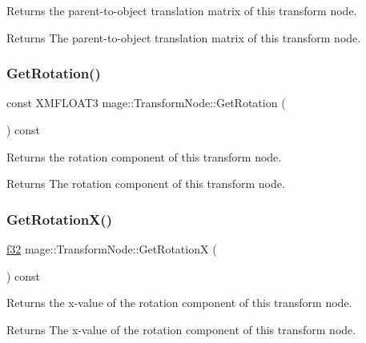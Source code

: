 Returns the parent-\/to-\/object translation matrix of this transform node.

\begin{DoxyReturn}{Returns}
The parent-\/to-\/object translation matrix of this transform node. 
\end{DoxyReturn}
\hypertarget{structmage_1_1_transform_node_ae785911d718434387199a92c6966a9b7}{}\label{structmage_1_1_transform_node_ae785911d718434387199a92c6966a9b7} 
\subsubsection{\texorpdfstring{Get\+Rotation()}{GetRotation()}}
{\footnotesize\ttfamily const X\+M\+F\+L\+O\+A\+T3 mage\+::\+Transform\+Node\+::\+Get\+Rotation (\begin{DoxyParamCaption}{ }\end{DoxyParamCaption}) const\hspace{0.3cm}{\ttfamily [noexcept]}}

Returns the rotation component of this transform node.

\begin{DoxyReturn}{Returns}
The rotation component of this transform node. 
\end{DoxyReturn}
\hypertarget{structmage_1_1_transform_node_a79d341ca59732b0852b71a3915f7d2c2}{}\label{structmage_1_1_transform_node_a79d341ca59732b0852b71a3915f7d2c2} 
\subsubsection{\texorpdfstring{Get\+Rotation\+X()}{GetRotationX()}}
{\footnotesize\ttfamily \hyperlink{namespacemage_a6a44ad388483959dc4dff9f2aef91431}{f32} mage\+::\+Transform\+Node\+::\+Get\+RotationX (\begin{DoxyParamCaption}{ }\end{DoxyParamCaption}) const\hspace{0.3cm}{\ttfamily [noexcept]}}

Returns the x-\/value of the rotation component of this transform node.

\begin{DoxyReturn}{Returns}
The x-\/value of the rotation component of this transform node. 
\end{DoxyReturn}
\hypertarget{structmage_1_1_transform_node_ae4bac5f8b18c06fcee3b81874b438798}{}\label{structmage_1_1_transform_node_ae4bac5f8b18c06fcee3b81874b438798} 
